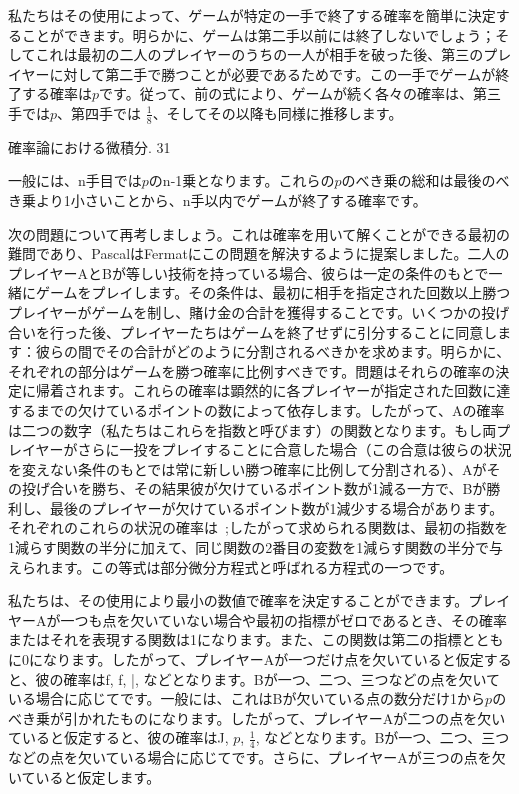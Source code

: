 \documentclass[a4paper,11pt,openany]{ltjsbook}
\begin{document}
私たちはその使用によって、ゲームが特定の一手で終了する確率を簡単に決定することができます。明らかに、ゲームは第二手以前には終了しないでしょう；そしてこれは最初の二人のプレイヤーのうちの一人が相手を破った後、第三のプレイヤーに対して第二手で勝つことが必要であるためです。この一手でゲームが終了する確率は$p$です。従って、前の式により、ゲームが続く各々の確率は、第三手では$p$、第四手では $\frac{1}{8}$、そしてその以降も同様に推移します。

確率論における微積分. 31

一般には、n手目では$p$のn-1乗となります。これらの$p$のべき乗の総和は最後のべき乗より1小さいことから、n手以内でゲームが終了する確率です。

次の問題について再考しましょう。これは確率を用いて解くことができる最初の難問であり、PascalはFermatにこの問題を解決するように提案しました。二人のプレイヤーAとBが等しい技術を持っている場合、彼らは一定の条件のもとで一緒にゲームをプレイします。その条件は、最初に相手を指定された回数以上勝つプレイヤーがゲームを制し、賭け金の合計を獲得することです。いくつかの投げ合いを行った後、プレイヤーたちはゲームを終了せずに引分することに同意します：彼らの間でその合計がどのように分割されるべきかを求めます。明らかに、それぞれの部分はゲームを勝つ確率に比例すべきです。問題はそれらの確率の決定に帰着されます。これらの確率は顕然的に各プレイヤーが指定された回数に達するまでの欠けているポイントの数によって依存します。したがって、Aの確率は二つの数字（私たちはこれらを指数と呼びます）の関数となります。もし両プレイヤーがさらに一投をプレイすることに合意した場合（この合意は彼らの状況を変えない条件のもとでは常に新しい勝つ確率に比例して分割される）、Aがその投げ合いを勝ち、その結果彼が欠けているポイント数が1減る一方で、Bが勝利し、最後のプレイヤーが欠けているポイント数が1減少する場合があります。それぞれのこれらの状況の確率は\ ;したがって求められる関数は、最初の指数を1減らす関数の半分に加えて、同じ関数の2番目の変数を1減らす関数の半分で与えられます。この等式は部分微分方程式と呼ばれる方程式の一つです。

私たちは、その使用により最小の数値で確率を決定することができます。プレイヤーAが一つも点を欠いていない場合や最初の指標がゼロであるとき、その確率またはそれを表現する関数は1になります。また、この関数は第二の指標とともに0になります。したがって、プレイヤーAが一つだけ点を欠いていると仮定すると、彼の確率はf, f, |, などとなります。Bが一つ、二つ、三つなどの点を欠いている場合に応じてです。一般には、これはBが欠いている点の数分だけ1から$p$のべき乗が引かれたものになります。したがって、プレイヤーAが二つの点を欠いていると仮定すると、彼の確率はJ, $p$, $\frac{1}{4}$, などとなります。Bが一つ、二つ、三つなどの点を欠いている場合に応じてです。さらに、プレイヤーAが三つの点を欠いていると仮定します。
\end{document}
